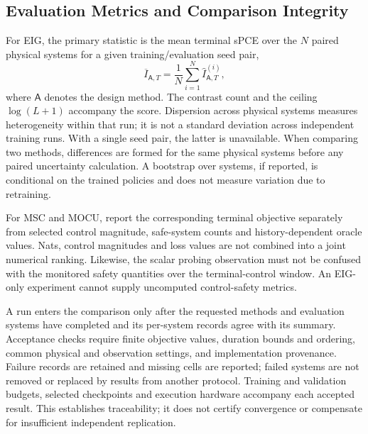 \documentclass[journal]{IEEEtran}
\begin{document}
\subsection{Evaluation Metrics and Comparison Integrity}
For EIG, the primary statistic is the mean terminal sPCE over the $N$ paired
physical systems for a given training/evaluation seed pair,
\begin{equation}
\overline I_{\mathsf A,T}=\frac{1}{N}\sum_{i=1}^{N}\widehat I_{\mathsf A,T}^{(i)},
\label{eq:reported-spce}
\end{equation}
where $\mathsf A$ denotes the design method. The contrast count and the ceiling
$\log(L+1)$ accompany the score. Dispersion across physical systems measures
heterogeneity within that run; it is not a standard deviation across
independent training runs. With a single seed pair, the latter is unavailable.
When comparing two methods, differences are formed for the same physical
systems before any paired uncertainty calculation. A bootstrap over systems,
if reported, is conditional on the trained policies and does not measure
variation due to retraining.

For MSC and MOCU, report the corresponding terminal objective separately from
selected control magnitude, safe-system counts and history-dependent oracle
values. Nats, control magnitudes and loss values are not combined into a joint
numerical ranking. Likewise, the scalar probing observation must not
be confused with the monitored safety quantities over the terminal-control
window. An EIG-only experiment cannot supply uncomputed control-safety metrics.

A run enters the comparison only after the requested methods and evaluation
systems have completed and its per-system records agree with its summary.
Acceptance checks require finite objective values, duration bounds and
ordering, common physical and observation settings, and implementation
provenance. Failure records are retained and missing cells are reported;
failed systems are not removed or replaced by results from another protocol. Training and
validation budgets, selected checkpoints and execution hardware accompany
each accepted result. This establishes traceability; it does not certify
convergence or compensate for insufficient independent replication.
\end{document}
